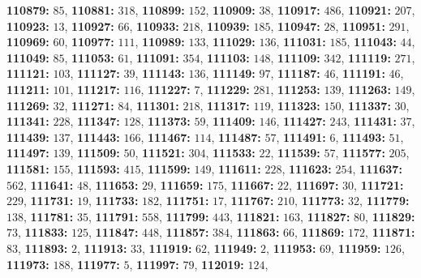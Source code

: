 \textsf{\bfseries 110879:} $85$, \textsf{\bfseries 110881:} $318$, \textsf{\bfseries 110899:} $152$, \textsf{\bfseries 110909:} $38$, \textsf{\bfseries 110917:} $486$, \textsf{\bfseries 110921:} $207$, \textsf{\bfseries 110923:} $13$, \textsf{\bfseries 110927:} $66$, \textsf{\bfseries 110933:} $218$, \textsf{\bfseries 110939:} $185$, \textsf{\bfseries 110947:} $28$, \textsf{\bfseries 110951:} $291$, \textsf{\bfseries 110969:} $60$, \textsf{\bfseries 110977:} $111$, \textsf{\bfseries 110989:} $133$, \textsf{\bfseries 111029:} $136$, \textsf{\bfseries 111031:} $185$, \textsf{\bfseries 111043:} $44$, \textsf{\bfseries 111049:} $85$, \textsf{\bfseries 111053:} $61$, \textsf{\bfseries 111091:} $354$, \textsf{\bfseries 111103:} $148$, \textsf{\bfseries 111109:} $342$, \textsf{\bfseries 111119:} $271$, \textsf{\bfseries 111121:} $103$, \textsf{\bfseries 111127:} $39$, \textsf{\bfseries 111143:} $136$, \textsf{\bfseries 111149:} $97$, \textsf{\bfseries 111187:} $46$, \textsf{\bfseries 111191:} $46$, \textsf{\bfseries 111211:} $101$, \textsf{\bfseries 111217:} $116$, \textsf{\bfseries 111227:} $7$, \textsf{\bfseries 111229:} $281$, \textsf{\bfseries 111253:} $139$, \textsf{\bfseries 111263:} $149$, \textsf{\bfseries 111269:} $32$, \textsf{\bfseries 111271:} $84$, \textsf{\bfseries 111301:} $218$, \textsf{\bfseries 111317:} $119$, \textsf{\bfseries 111323:} $150$, \textsf{\bfseries 111337:} $30$, \textsf{\bfseries 111341:} $228$, \textsf{\bfseries 111347:} $128$, \textsf{\bfseries 111373:} $59$, \textsf{\bfseries 111409:} $146$, \textsf{\bfseries 111427:} $243$, \textsf{\bfseries 111431:} $37$, \textsf{\bfseries 111439:} $137$, \textsf{\bfseries 111443:} $166$, \textsf{\bfseries 111467:} $114$, \textsf{\bfseries 111487:} $57$, \textsf{\bfseries 111491:} $6$, \textsf{\bfseries 111493:} $51$, \textsf{\bfseries 111497:} $139$, \textsf{\bfseries 111509:} $50$, \textsf{\bfseries 111521:} $304$, \textsf{\bfseries 111533:} $22$, \textsf{\bfseries 111539:} $57$, \textsf{\bfseries 111577:} $205$, \textsf{\bfseries 111581:} $155$, \textsf{\bfseries 111593:} $415$, \textsf{\bfseries 111599:} $149$, \textsf{\bfseries 111611:} $228$, \textsf{\bfseries 111623:} $254$, \textsf{\bfseries 111637:} $562$, \textsf{\bfseries 111641:} $48$, \textsf{\bfseries 111653:} $29$, \textsf{\bfseries 111659:} $175$, \textsf{\bfseries 111667:} $22$, \textsf{\bfseries 111697:} $30$, \textsf{\bfseries 111721:} $229$, \textsf{\bfseries 111731:} $19$, \textsf{\bfseries 111733:} $182$, \textsf{\bfseries 111751:} $17$, \textsf{\bfseries 111767:} $210$, \textsf{\bfseries 111773:} $32$, \textsf{\bfseries 111779:} $138$, \textsf{\bfseries 111781:} $35$, \textsf{\bfseries 111791:} $558$, \textsf{\bfseries 111799:} $443$, \textsf{\bfseries 111821:} $163$, \textsf{\bfseries 111827:} $80$, \textsf{\bfseries 111829:} $73$, \textsf{\bfseries 111833:} $125$, \textsf{\bfseries 111847:} $448$, \textsf{\bfseries 111857:} $384$, \textsf{\bfseries 111863:} $66$, \textsf{\bfseries 111869:} $172$, \textsf{\bfseries 111871:} $83$, \textsf{\bfseries 111893:} $2$, \textsf{\bfseries 111913:} $33$, \textsf{\bfseries 111919:} $62$, \textsf{\bfseries 111949:} $2$, \textsf{\bfseries 111953:} $69$, \textsf{\bfseries 111959:} $126$, \textsf{\bfseries 111973:} $188$, \textsf{\bfseries 111977:} $5$, \textsf{\bfseries 111997:} $79$, \textsf{\bfseries 112019:} $124$, 
